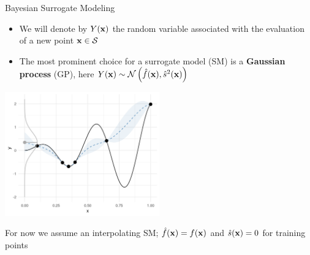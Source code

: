\documentclass[11pt,compress,t,notes=noshow, xcolor=table]{beamer}
\begin{document}
\begin{vbframe}{Bayesian Surrogate Modeling}
\framebreak

\begin{itemize}
\item We will denote by $Y(\mathbf{x})$ the random variable associated with the evaluation of a new point $\mathbf{x} \in \mathcal{S}$
\item The most prominent choice for a surrogate model (SM) is a \textbf{Gaussian process} (GP), here $Y(\mathbf{x}) \sim \mathcal{N}\left(\hat{f}(\mathbf{x}), \hat{s}^2(\mathbf{x})\right)$
\end{itemize}

\begin{center}
  \includegraphics[width = 0.5\textwidth]{figure_man/bayesian_loop_sm_normal.png}
\end{center}

\vfill

\begin{footnotesize}
For now we assume an interpolating SM; $\hat{f}(\mathbf{x}) = f(\mathbf{x})$ and $\hat{s}(\mathbf{x}) = 0$ for training points
\end{footnotesize}

\end{vbframe} 
\end{document}
